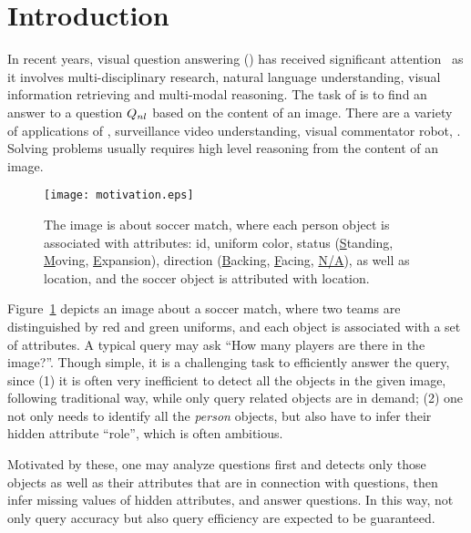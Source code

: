 \section{Introduction}
\label{sec-intro}

In recent years, visual question answering (\vqa) has received significant attention~\cite{malinowski2015ask,ren2015image,gao2015you} as it involves multi-disciplinary research, \eg natural language understanding, visual information retrieving and multi-modal reasoning. The task of \vqa is to find an answer to a question $Q_{nl}$ based on the content of an image. There are a variety of applications of \vqa, \eg surveillance video understanding, visual commentator robot, \etc. Solving \vqa problems usually requires high level reasoning from the content of an image.

\begin{figure}[tb]
\centering
\texttt{[image: motivation.eps]}
\caption{The image is about soccer match, where each person object is associated with attributes: id, uniform color, status (\underline{S}tanding, \underline{M}oving, \underline{E}xpansion), direction (\underline{B}acking, \underline{F}acing, \underline{N/A}), as well as location, and the soccer object is attributed with location. %
}
\vspace{-4ex}
\label{fig:example}
\end{figure}


\begin{example}
Figure~\ref{fig:example} depicts an image about a soccer match, where two teams are distinguished by red and green uniforms, and each object is associated with a set of attributes. A typical query may ask ``How many players are there in the image?''. Though simple, it is a challenging task to efficiently answer the query, since (1) it is often very inefficient to detect all the objects in the given image, following traditional way, while only query related objects are in demand; (2) one not only needs to identify all the {\em person} objects, but also have to infer their hidden attribute ``role'', which is often ambitious. 

Motivated by these, one may analyze questions first and detects only those objects as well as their attributes that are in connection with questions, then infer missing values of hidden attributes, and answer questions. In this way, not only query accuracy but also query efficiency are expected to be guaranteed.  
\end{example}



